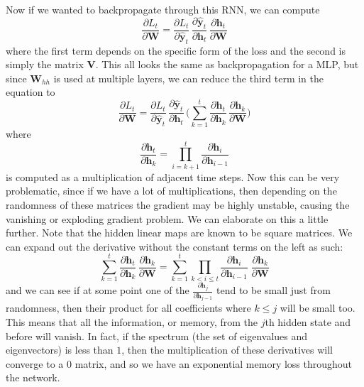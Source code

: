 \documentclass{article}
\begin{document}
    Now if we wanted to backpropagate through this RNN, we can compute 
    \begin{equation}
      \frac{\partial L_t}{\partial \mathbf{W}} = \frac{\partial L_t}{\partial \hat{\mathbf{y}}_t} \, \frac{\partial \hat{\mathbf{y}}_t}{\partial \mathbf{h}_t} \, \frac{\partial \mathbf{h}_t}{\partial \mathbf{W}}
    \end{equation}
    where the first term depends on the specific form of the loss and the second is simply the matrix $\mathbf{V}$. This all looks the same as backpropagation for a MLP, but since $\mathbf{W}_{hh}$ is used at multiple layers, we can reduce the third term in the equation to 
    \begin{equation}
      \frac{\partial L_t}{\partial \mathbf{W}} = \frac{\partial L_t}{\partial \hat{\mathbf{y}}_t} \, \frac{\partial \hat{\mathbf{y}}_t}{\partial \mathbf{h}_t} \, \bigg(\sum_{k=1}^t \frac{\partial \mathbf{h}_t}{\partial \mathbf{h}_k} \, \frac{\partial \mathbf{h}_k}{\partial \mathbf{W}} \bigg)
    \end{equation}
    where 
    \begin{equation}
      \frac{\partial \mathbf{h}_t}{\partial \mathbf{h}_k}  = \prod_{i=k+1}^{t} \frac{\partial \mathbf{h}_i}{\partial \mathbf{h}_{i-1}}
    \end{equation}
    is computed as a multiplication of adjacent time steps. Now this can be very problematic, since if we have a lot of multiplications, then depending on the randomness of these matrices the gradient may be highly unstable, causing the vanishing or exploding gradient problem. We can elaborate on this a little further. Note that the hidden linear maps are known to be square matrices. We can expand out the derivative without the constant terms on the left as such: 
    \begin{equation}
      \sum_{k=1}^t \frac{\partial \mathbf{h}_t}{\partial \mathbf{h}_k} \, \frac{\partial \mathbf{h}_k}{\partial \mathbf{W}} = \sum_{k=1}^t \prod_{k < i \leq t} \frac{\partial \mathbf{h}_i}{\partial \mathbf{h}_{i-1}} \; \frac{\partial \mathbf{h}_k}{\partial \mathbf{W}}
    \end{equation}
    and we can see if at some point one of the $\frac{\partial \mathbf{h}_j}{\partial \mathbf{h}_{j-1}}$ tend to be small just from randomness, then their product for all coefficients where $k \leq j$ will be small too. This means that all the information, or memory, from the $j$th hidden state and before will vanish. In fact, if the spectrum (the set of eigenvalues and eigenvectors) is less than $1$, then the multiplication of these derivatives will converge to a $0$ matrix, and so we have an exponential memory loss throughout the network. 
\end{document}
